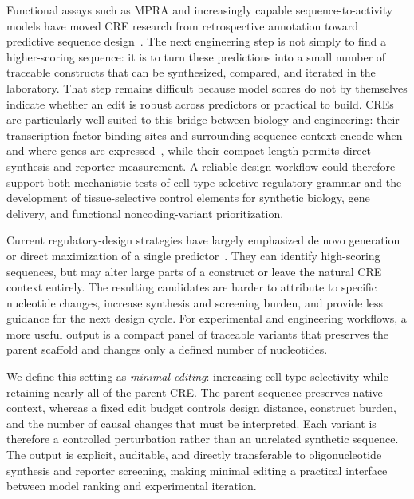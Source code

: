 Functional assays such as MPRA and increasingly capable sequence-to-activity models
have moved CRE research from retrospective annotation toward predictive sequence
design~\citep{Melnikov2012,Arnold2013,Tewhey2016,Inoue2017,Gordon2020,Kircher2019,
Avsec2021,Taskiran2024,Gosai2024}. The next engineering step is not simply to find a
higher-scoring sequence: it is to turn these predictions into a small number of
traceable constructs that can be synthesized, compared, and iterated in the laboratory.
That step remains difficult because model scores do not by themselves indicate whether
an edit is robust across predictors or practical to build. CREs are particularly well
suited to this bridge between biology and engineering: their transcription-factor
binding sites and surrounding sequence context encode when and where genes are
expressed~\citep{Wasserman2004,ENCODE2012,Thurman2012,Roadmap2015,Sahu2022}, while
their compact length permits direct synthesis and reporter measurement. A reliable
design workflow could therefore support both mechanistic tests of cell-type-selective
regulatory grammar and the development of tissue-selective control elements for
synthetic biology, gene delivery, and functional noncoding-variant prioritization.

Current regulatory-design strategies have largely emphasized de novo generation or
direct maximization of a single predictor~\citep{Vaishnav2022,Almeida2024,Gosai2024}.
They can identify high-scoring sequences, but may alter large parts of a construct or
leave the natural CRE context entirely. The resulting candidates are harder to
attribute to specific nucleotide changes, increase synthesis and screening burden, and
provide less guidance for the next design cycle. For experimental and engineering
workflows, a more useful output is a compact panel of traceable variants that preserves
the parent scaffold and changes only a defined number of nucleotides.

We define this setting as \emph{minimal editing}: increasing cell-type selectivity while
retaining nearly all of the parent CRE. The parent sequence preserves native context,
whereas a fixed edit budget controls design distance, construct burden, and the number
of causal changes that must be interpreted. Each variant is therefore a controlled
perturbation rather than an unrelated synthetic sequence. The output is explicit,
auditable, and directly transferable to oligonucleotide synthesis and reporter
screening, making minimal editing a practical interface between model ranking and
experimental iteration.

